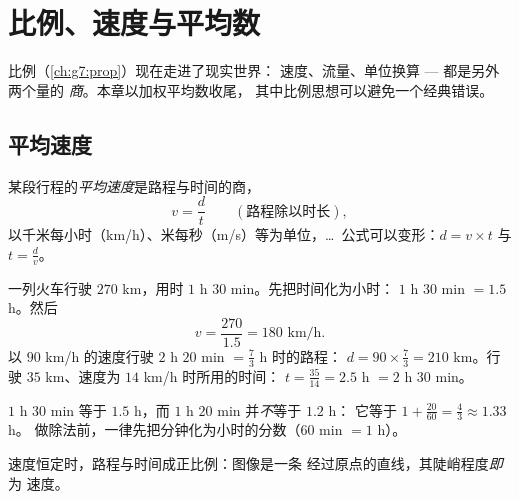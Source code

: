 \chapter{比例、速度与平均数}\label{ch:g8:speed}

比例（\cref{ch:g7:prop}）现在走进了现实世界：
速度、流量、单位换算 --- 都是另外两个量的
\emph{商}。本章以加权平均数收尾，
其中比例思想可以避免一个经典错误。

\section{平均速度}

\begin{definition}[平均速度]\label{def:g8:speed:def}
某段行程的\emph{平均速度}是路程与时间的商，
\[
v = \frac{d}{t}
\qquad
\left(\text{路程除以时长}\right),
\]
以千米每小时（km/h）、米每秒（m/s）等为单位，\dots\ 
公式可以变形：$d = v \times t$ 与 $t = \frac{d}{v}$。
\end{definition}

\begin{example}\label{ex:g8:speed:basic}
一列火车行驶 $270$ km，用时 $1$ h $30$ min。先把时间化为小时：
$1$ h $30$ min $= 1.5$ h。然后
\[
v = \frac{270}{1.5} = 180 \text{ km/h}.
\]
以 $90$ km/h 的速度行驶 $2$ h $20$ min $= \frac73$ h 时的路程：
$d = 90 \times \frac73 = 210$ km。行驶 $35$ km、速度为 $14$ km/h 时所用的时间：
$t = \frac{35}{14} = 2.5$ h $= 2$ h $30$ min。
\end{example}

\begin{remark}[分钟不是小数]
$1$ h $30$ min 等于 $1.5$ h，而 $1$ h $20$ min 并\emph{不}等于 $1.2$ h：
它等于 $1 + \frac{20}{60} = \frac43 \approx 1.33$ h。
做除法前，一律先把分钟化为小时的分数（$60$ min $= 1$ h）。
\end{remark}

\begin{omfigure}

{\small 速度恒定时，路程与时间成正比例：图像是一条
经过原点的直线，其陡峭程度\emph{即}为
速度。}
\end{omfigure}

